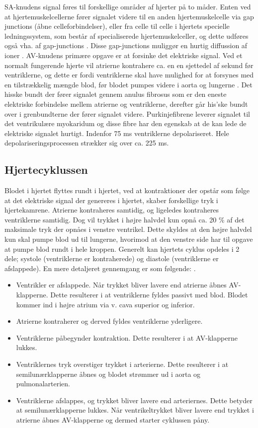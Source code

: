 SA-knudens signal føres til forskellige områder af hjerter på to måder. Enten ved at hjertemuskelcellerne fører signalet videre til en anden hjertemuskelcelle via gap junctions (åbne celleforbindelser), eller fra celle til celle i hjertets specielle ledningssystem, som består af specialiserede hjertemuskelceller, og dette udføres også vha. af gap-junctions \cite{gronanatomi}. 
Disse gap-junctions muliggør en hurtig diffussion af ioner \cite{guyton}.
AV-knudens primære opgave er at  forsinke det elektriske signal. Ved et normalt fungerende hjerte vil atrierne kontrahere ca. en en sjettedel af sekund før ventriklerne, og dette er fordi ventriklerne skal have mulighed for at forsynes med en tilstrækkelig mængde blod, før blodet pumpes videre i aorta og lungerne \cite{guyton}.
Det hisske bundt der fører signalet gennem anulus fibrosus som er den eneste elektriske forbindelse mellem atrierne og ventriklerne, derefter går his'ske bundt over i grenbundterne der fører signalet videre. Purkinjefibrene leverer signalet til det ventrikulære myokaridum og disse fibre har den egenskab at de kan lede de elektriske signalet hurtigt. Indenfor 75 ms ventriklerne depolariseret\cite{gronanatomi}. Hele depolariseringsprocessen strækker sig over ca. 225 ms.

\subsection{Hjertecyklussen}
Blodet i hjertet flyttes rundt i hjertet, ved at kontraktioner der opstår som følge at det elektriske signal der genereres i hjertet, skaber forskellige tryk i hjertekamrene. Atrierne kontraheres samtidig, og ligeledes kontraheres ventriklerne samtidig. Dog vil trykket i højre halvdel kun opnå ca. 20 \% af det maksimale tryk der opnåes i venstre ventrikel. Dette skyldes at den højre halvdel kun skal pumpe blod ud til lungerne, hvorimod at den venstre side har til opgave at pumpe blod rundt i hele kroppen. Generelt kan hjertets cyklus opdeles i 2 dele; systole (ventriklerne er kontraherede)  og diastole (ventriklerne er afslappede).  En mere detaljeret gennemgang er som følgende: \cite{gronanatomi}.


\begin{itemize}
\item Ventrikler er afslappede. Når trykket bliver lavere end atrierne åbnes AV-klapperne. Dette resulterer i at ventriklerne fyldes passivt med blod. Blodet kommer ind i højre atrium via v. cava superior og inferior.
\item Atrierne kontraherer og derved fyldes ventriklerne yderligere.
\item Ventriklerne påbegynder kontraktion. Dette resulterer i at AV-klapperne lukkes.
\item Ventriklernes tryk overstiger trykket i arterierne. Dette resulterer i at semilunærklapperne åbnes og blodet strømmer ud i aorta og pulmonalarterien.
\item Ventriklerne afslappes, og trykket bliver lavere end arteriernes. Dette betyder at semilunærklapperne lukkes. Når ventrikeltrykket bliver lavere end trykket i atrierne åbnes AV-klapperne og dermed starter cyklussen påny.
\end{itemize}

